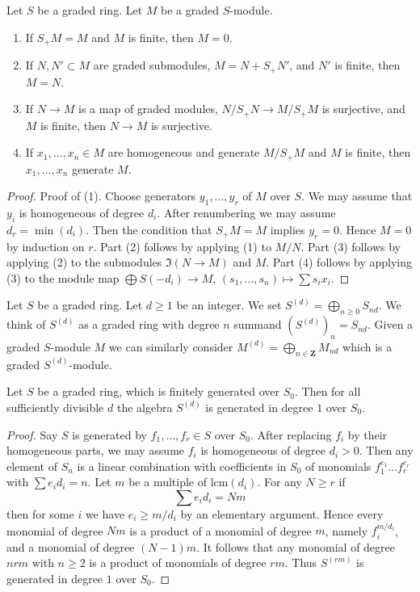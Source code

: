 \begin{lemma}
\label{lemma-graded-NAK}
Let $S$ be a graded ring. Let $M$ be a graded $S$-module.
\begin{enumerate}
\item If $S_+M = M$ and $M$ is finite, then $M = 0$.
\item If $N, N' \subset M$ are graded submodules,
$M = N + S_+N'$, and $N'$ is finite, then $M = N$.
\item If $N \to M$ is a map of graded modules, $N/S_+N \to M/S_+M$
is surjective, and $M$ is finite, then $N \to M$ is surjective.
\item If $x_1, \ldots, x_n \in M$ are homogeneous and generate $M/S_+M$
and $M$ is finite, then $x_1, \ldots, x_n$ generate $M$.
\end{enumerate}
\end{lemma}

\begin{proof}
Proof of (1). Choose generators $y_1, \ldots, y_r$ of $M$ over $S$.
We may assume that $y_i$ is homogeneous of degree $d_i$. After
renumbering we may assume $d_r = \min(d_i)$. Then the condition that
$S_+M = M$ implies $y_r = 0$. Hence $M = 0$ by induction on $r$.
Part (2) follows by applying (1) to $M/N$. Part (3) follows by
applying (2) to the submodules $\Im(N \to M)$ and $M$.
Part (4) follows by applying (3) to the module map
$\bigoplus S(-d_i) \to M$, $(s_1, \ldots, s_n) \mapsto \sum s_i x_i$.
\end{proof}

\noindent
Let $S$ be a graded ring. Let $d \geq 1$ be an integer.
We set $S^{(d)} = \bigoplus_{n \geq 0} S_{nd}$. We think of
$S^{(d)}$ as a graded ring with degree $n$ summand
$(S^{(d)})_n = S_{nd}$. Given a graded $S$-module $M$ we
can similarly consider $M^{(d)} = \bigoplus_{n \in \mathbf{Z}} M_{nd}$
which is a graded $S^{(d)}$-module.

\begin{lemma}
\label{lemma-uple-generated-degree-1}
Let $S$ be a graded ring, which is finitely generated over $S_0$.
Then for all sufficiently divisible $d$ the algebra
$S^{(d)}$ is generated in degree $1$ over $S_0$.
\end{lemma}

\begin{proof}
Say $S$ is generated by $f_1, \ldots, f_r \in S$ over $S_0$.
After replacing $f_i$ by their homogeneous parts, we may assume
$f_i$ is homogeneous of degree $d_i > 0$. Then any element of
$S_n$ is a linear combination with coefficients in $S_0$ of monomials
$f_1^{e_1} \ldots f_r^{e_r}$ with $\sum e_i d_i = n$.
Let $m$ be a multiple of $\text{lcm}(d_i)$. For any $N \geq r$ if
$$
\sum e_i d_i = N m
$$
then for some $i$ we have $e_i \geq m/d_i$ by an elementary argument.
Hence every monomial of degree $N m$ is a product of a monomial
of degree $m$, namely $f_i^{m/d_i}$, and a monomial of degree $(N - 1)m$.
It follows that any monomial of degree $nrm$ with $n \geq 2$
is a product of monomials of degree $rm$. Thus $S^{(rm)}$ is generated
in degree $1$ over $S_0$.
\end{proof}

